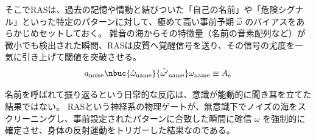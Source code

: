 そこでRASは、過去の記憶や情動と結びついた「自己の名前」や「危険シグナル」といった特定のパターンに対して、極めて高い事前予期 $\hat{\omega}$ のバイアスをあらかじめセットしておく。
雑音の海からその特徴量（名前の音素配列など）が微小でも検出された瞬間、RASは皮質へ覚醒信号を送り、その信号の尤度を一気に引き上げて閾値を突破させる。
\begin{equation}
    a_{\mathrm{noise}} \nbuc{\hat{\omega}_{\mathrm{name}}}{\hat{\omega'}_{\mathrm{name}}} \omega_{\mathrm{name}} \equiv A_e
\end{equation}

名前を呼ばれて振り返るという日常的な反応は、意識が能動的に聞き耳を立てた結果ではない。
RASという神経系の物理ゲートが、無意識下でノイズの海をスクリーニングし、事前設定されたパターンに合致した瞬間に確信 $\omega$ を強制的に確定させ、身体の反射運動をトリガーした結果なのである。


